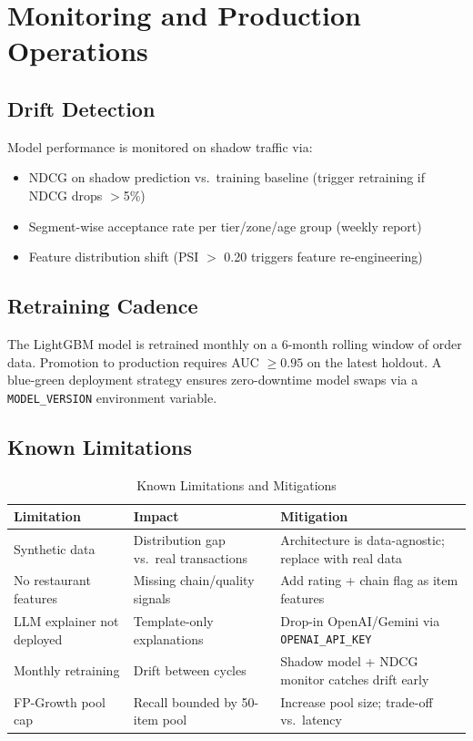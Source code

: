 \documentclass[conference]{IEEEtran}
\begin{document}
\section{Monitoring and Production Operations}

\subsection{Drift Detection}

Model performance is monitored on shadow traffic via:
\begin{itemize}
  \item NDCG on shadow prediction vs.\ training baseline (trigger retraining
        if NDCG drops $>$5\%)
  \item Segment-wise acceptance rate per tier/zone/age group (weekly report)
  \item Feature distribution shift (PSI $>$ 0.20 triggers feature re-engineering)
\end{itemize}

\subsection{Retraining Cadence}

The LightGBM model is retrained monthly on a 6-month rolling window of order
data. Promotion to production requires AUC $\geq 0.95$ on the latest holdout.
A blue-green deployment strategy ensures zero-downtime model swaps via a
\texttt{MODEL\_VERSION} environment variable.

\subsection{Known Limitations}

\begin{table}[h]
\caption{Known Limitations and Mitigations}
\centering
\begin{tabular}{p{2.2cm}p{2.4cm}p{2.4cm}}
\toprule
Limitation & Impact & Mitigation \\
\midrule
Synthetic data & Distribution gap vs.\ real transactions & Architecture is data-agnostic; replace with real data \\
\addlinespace
No restaurant features & Missing chain/quality signals & Add rating + chain flag as item features \\
\addlinespace
LLM explainer not deployed & Template-only explanations & Drop-in OpenAI/Gemini via \texttt{OPENAI\_API\_KEY} \\
\addlinespace
Monthly retraining & Drift between cycles & Shadow model + NDCG monitor catches drift early \\
\addlinespace
FP-Growth pool cap & Recall bounded by 50-item pool & Increase pool size; trade-off vs.\ latency \\
\bottomrule
\end{tabular}
\end{table}
\end{document}
